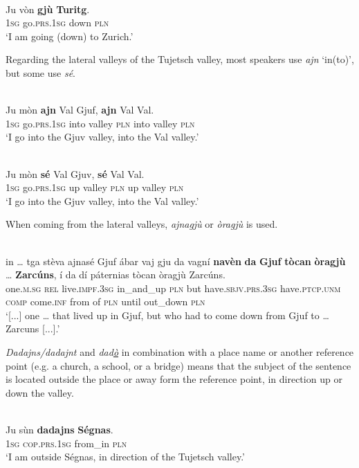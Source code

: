 \ea
\label{}
\\
\gll  Ju vòn \textbf{gjù} \textbf{Turitg}.  \\
\textsc{1sg} go.\textsc{prs.1sg} down \textsc{pln}\\
\glt `I am going (down) to Zurich.'
\z

Regarding the lateral valleys of the Tujetsch valley, most speakers use \textit{ajn} `in(to)', but some use \textit{sé}.

\ea
\label{}
\\
\gll Ju mòn \textbf{ajn} Val Gjuf, \textbf{ajn} Val Val.\\
\textsc{1sg} go.\textsc{prs.1sg} into valley \textsc{pln} into valley \textsc{pln}\\
\glt `I go into the Gjuv valley, into the Val valley.'
\z

\ea
\label{}
\\
\gll Ju mòn \textbf{sé} Val Gjuv, \textbf{sé} Val Val.\\
\textsc{1sg} go.\textsc{prs.1sg} up valley \textsc{pln} up valley \textsc{pln}\\
\glt `I go into the Gjuv valley, into the Val valley.'
\z

When coming from the lateral valleys, \textit{ajnagjù} or \textit{òragjù} is used.

\ea
\label{}
\\
\gll [...] in … tga stèva ajnasé Gjuf ábar vaj gju da vagní \textbf{navèn} \textbf{da} \textbf{Gjuf} \textbf{tòcan} \textbf{òragjù} … \textbf{Zarcúns}, í da dí páternias tòcan òragjù Zarcúns.\\
{} one.\textsc{m.sg} {} \textsc{rel} live.\textsc{impf.3sg} in\_and\_up \textsc{pln} but  have.\textsc{sbjv.prs.3sg} have.\textsc{ptcp.unm} \textsc{comp} come.\textsc{inf} from of \textsc{pln} until out\_down {} \textsc{pln} \\
\glt `[...] one … that lived up in Gjuf, but who had to come down from Gjuf to … Zarcuns [...].'
\z

\textit{Dadajns/dadajnt} and \textit{dad\underline{ò}} in combination with a place name or another reference point (e.g. a church, a school, or a bridge) means that the subject of the sentence is located outside the place or away form the reference point, in direction up or down the valley.

\ea
\label{}
\\
\gll Ju sùn \textbf{dadajns} \textbf{Ségnas}.\\
\textsc{1sg} \textsc{cop.prs.1sg} from\_in \textsc{pln}\\
\glt `I am outside Ségnas, in direction of the Tujetsch valley.'
\z

